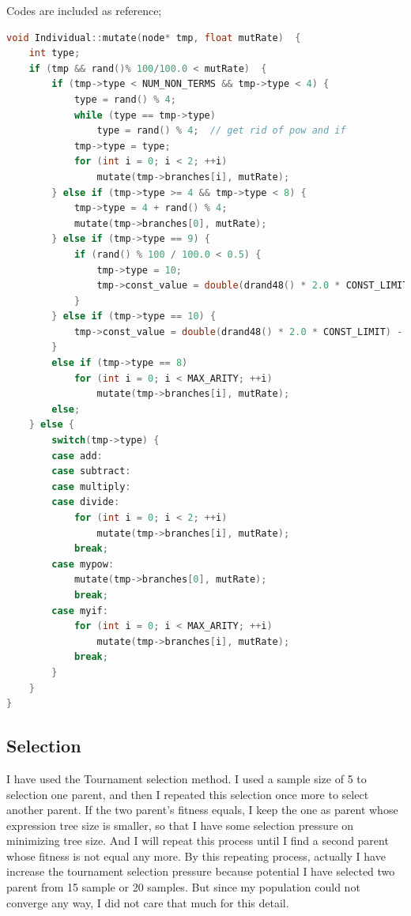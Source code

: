 \documentclass[10pt,b5paper]{article}
\begin{document}
Codes are included as reference; 
\begin{lstlisting}[language=c++]
void Individual::mutate(node* tmp, float mutRate)  {
    int type;
    if (tmp && rand()% 100/100.0 < mutRate)  {    
        if (tmp->type < NUM_NON_TERMS && tmp->type < 4) {        
            type = rand() % 4;
            while (type == tmp->type)               
                type = rand() % 4;  // get rid of pow and if
            tmp->type = type;
            for (int i = 0; i < 2; ++i)
                mutate(tmp->branches[i], mutRate);
        } else if (tmp->type >= 4 && tmp->type < 8) {        
            tmp->type = 4 + rand() % 4;
            mutate(tmp->branches[0], mutRate);
        } else if (tmp->type == 9) {        
            if (rand() % 100 / 100.0 < 0.5) {            
                tmp->type = 10;
                tmp->const_value = double(drand48() * 2.0 * CONST_LIMIT) - (CONST_LIMIT/2.0);
            }
        } else if (tmp->type == 10) {
            tmp->const_value = double(drand48() * 2.0 * CONST_LIMIT) - (CONST_LIMIT/2.0);    
        }
        else if (tmp->type == 8) 
            for (int i = 0; i < MAX_ARITY; ++i)
                mutate(tmp->branches[i], mutRate);
        else;
    } else {    
        switch(tmp->type) {        
        case add:
        case subtract:
        case multiply:
        case divide:
            for (int i = 0; i < 2; ++i)
                mutate(tmp->branches[i], mutRate);
            break;
        case mypow:
            mutate(tmp->branches[0], mutRate);
            break;
        case myif:
            for (int i = 0; i < MAX_ARITY; ++i)
                mutate(tmp->branches[i], mutRate);
            break;
        }
    }
}
\end{lstlisting}
\subsection{Selection}
\label{sec-1-4}
I have used the Tournament selection method. I used a sample size of 5 to selection one parent, and then I repeated this selection once more to select another parent. If the two parent's fitness equals, I keep the one as parent whose expression tree size is smaller, so that I have some selection pressure on minimizing tree size. And I will repeat this process until I find a second parent whose fitness is not equal any more. By this repeating process, actually I have increase the tournament selection pressure because potential I have selected two parent from 15 sample or 20 samples. But since my population could not converge any way, I did not care that much for this detail. 
\end{document}
